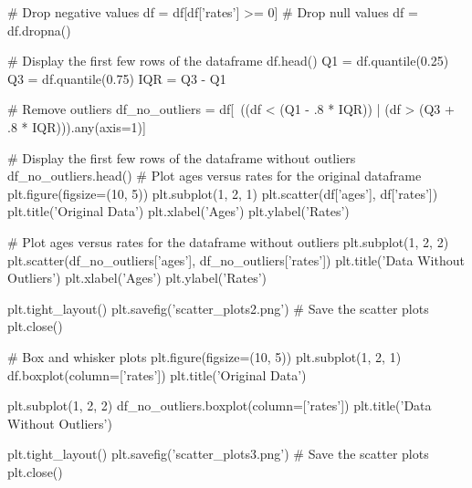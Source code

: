 \documentclass{beamer}
\begin{document}
\begin{pycode}
	
	# Drop negative values
df = df[df['rates'] >= 0]
# Drop null values
df = df.dropna()

# Display the first few rows of the dataframe
df.head()
Q1 = df.quantile(0.25)
Q3 = df.quantile(0.75)
IQR = Q3 - Q1

# Remove outliers
df_no_outliers = df[~((df < (Q1 - .8 * IQR)) | (df > (Q3 + .8 * IQR))).any(axis=1)]

# Display the first few rows of the dataframe without outliers
df_no_outliers.head()
# Plot ages versus rates for the original dataframe
plt.figure(figsize=(10, 5))
plt.subplot(1, 2, 1)
plt.scatter(df['ages'], df['rates'])
plt.title('Original Data')
plt.xlabel('Ages')
plt.ylabel('Rates')

# Plot ages versus rates for the dataframe without outliers
plt.subplot(1, 2, 2)
plt.scatter(df_no_outliers['ages'], df_no_outliers['rates'])
plt.title('Data Without Outliers')
plt.xlabel('Ages')
plt.ylabel('Rates')

plt.tight_layout()
plt.savefig('scatter_plots2.png')  # Save the scatter plots
plt.close()

# Box and whisker plots
plt.figure(figsize=(10, 5))
plt.subplot(1, 2, 1)
df.boxplot(column=['rates'])
plt.title('Original Data')

plt.subplot(1, 2, 2)
df_no_outliers.boxplot(column=['rates'])
plt.title('Data Without Outliers')

plt.tight_layout()
plt.savefig('scatter_plots3.png')  # Save the scatter plots
plt.close()

	
\end{pycode}
\end{document}

